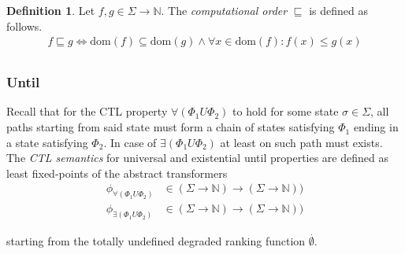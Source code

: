 \documentclass[11pt,a4paper,titlepage]{article}
\theoremstyle{definition}
\newtheorem{definition}{Definition}[section]
\begin{document}
\begin{definition}\label{def:computational_order}
    Let $f, g \in \Sigma \rightarrow \mathbb{N}$. 
    The \textit{computational order} $\sqsubseteq$ is defined as follows.
    \begin{align*}
        f \sqsubseteq g \iff \text{dom}(f) \subseteq \text{dom}(g) \land \forall x \in \text{dom}(f): f(x) \leq g(x) \\
    \end{align*}
\end{definition}

\subsubsection*{Until}

Recall that for the CTL property $\forall(\Phi_1 U \Phi_2)$ to hold for some state $\sigma \in \Sigma$, 
all paths starting from said state must form a chain of states satisfying $\Phi_1$ ending in a state satisfying $\Phi_2$. 
In case of $\exists(\Phi_1 U \Phi_2)$ at least on such path must exists.
The \textit{CTL semantics} for universal and existential \textsf{until} properties are defined as least fixed-points of the abstract transformers
\begin{align*}
\phi_{\forall(\Phi_1 U \Phi_2)} &\in (\Sigma \rightarrow \mathbb{N}) \rightarrow (\Sigma \rightarrow \mathbb{N}))\\
\phi_{\exists(\Phi_1 U \Phi_2)} &\in (\Sigma \rightarrow \mathbb{N}) \rightarrow (\Sigma \rightarrow \mathbb{N}))
\end{align*}

starting from the totally undefined degraded ranking function $\overset{.}{\emptyset}$.
\end{document}
